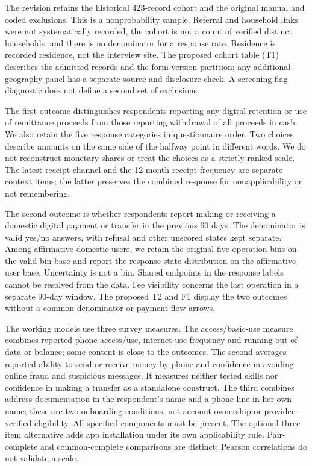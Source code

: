 \documentclass[12pt]{article}
\begin{document}
The revision retains the historical 423-record cohort and the original manual and coded exclusions. This is a nonprobability sample. Referral and household links were not systematically recorded, the cohort is not a count of verified distinct households, and there is no denominator for a response rate. Residence is recorded residence, not the interview site. The proposed cohort table (T1) describes the admitted records and the form-version partition; any additional geography panel has a separate source and disclosure check. A screening-flag diagnostic does not define a second set of exclusions.

The first outcome distinguishes respondents reporting any digital retention or use of remittance proceeds from those reporting withdrawal of all proceeds in cash. We also retain the five response categories in questionnaire order. Two choices describe amounts on the same side of the halfway point in different words. We do not reconstruct monetary shares or treat the choices as a strictly ranked scale. The latest receipt channel and the 12-month receipt frequency are separate context items; the latter preserves the combined response for nonapplicability or not remembering.

The second outcome is whether respondents report making or receiving a domestic digital payment or transfer in the previous 60 days. The denominator is valid yes/no answers, with refusal and other unscored states kept separate. Among affirmative domestic users, we retain the original five operation bins on the valid-bin base and report the response-state distribution on the affirmative-user base. Uncertainty is not a bin. Shared endpoints in the response labels cannot be resolved from the data. Fee visibility concerns the last operation in a separate 90-day window. The proposed T2 and F1 display the two outcomes without a common denominator or payment-flow arrows.

The working models use three survey measures. The access/basic-use measure combines reported phone access/use, internet-use frequency and running out of data or balance; some content is close to the outcomes. The second averages reported ability to send or receive money by phone and confidence in avoiding online fraud and suspicious messages. It measures neither tested skills nor confidence in making a transfer as a standalone construct. The third combines address documentation in the respondent's name and a phone line in her own name; these are two onboarding conditions, not account ownership or provider-verified eligibility. All specified components must be present. The optional three-item alternative adds app installation under its own applicability rule. Pair-complete and common-complete comparisons are distinct; Pearson correlations do not validate a scale.
\end{document}
